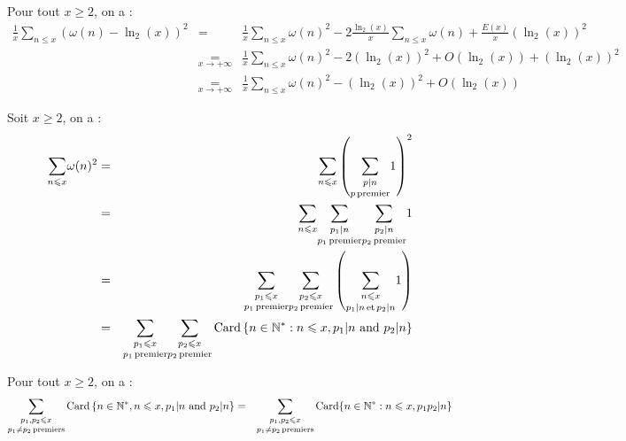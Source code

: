  Pour tout $x \geqslant 2$, on a :
\begin{eqnarray*}
  \frac{1}{x} \underset{n \leqslant x}{\sum} (\omega (n) - \ln_2 (x))^2 & = &
  \frac{1}{x} \underset{n \leqslant x}{\sum} \omega (n)^2 - 2 \frac{\ln_2
  (x)}{x} \underset{n \leqslant x}{\sum} \omega (n) + \frac{E (x)}{x} (\ln_2
  (x))^2\\
  & \underset{x \rightarrow + \infty}{=} & \frac{1}{x} \underset{n \leqslant
  x}{\sum} \omega (n)^2 - 2 (\ln_2 (x))^2 + O (\ln_2 (x)) + (\ln_2 (x))^2\\
  & \underset{x \rightarrow + \infty}{=} & \frac{1}{x} \underset{n \leqslant
  x}{\sum} \omega (n)^2 - (\ln_2 (x))^2 + O (\ln_2 (x))
\end{eqnarray*}


 Soit $x \geqslant 2$, on a :
\begin{eqnarray*}
  \underset{n \leqslant x}{\sum} \omega (n)^2 & = & \underset{n \leqslant
  x}{\sum} \left( \underset{p \operatorname{premier}}{\underset{p | n
  }{\sum}} 1 \underset{}{} \right)^2\\
  & = & \underset{n \leqslant x}{\sum} \underset{p_1
  \operatorname{premier}}{\underset{p_1 | n }{\sum}}  \underset{p_2
  \operatorname{premier}}{\underset{p_2 | n }{\sum}} 1 \underset{}{}\\
  & = & \underset{p_1 \operatorname{premier}}{\underset{p_1 \leqslant x}{\sum}}
  \underset{p_2 \operatorname{premier}}{\underset{p_2 \leqslant x}{\sum}} \left(
  \underset{p_1 | n  \operatorname{et} p_2 | n }{\underset{n
  \leqslant x}{\sum}} 1 \right)\\
  & = & \underset{p_1 \operatorname{premier}}{\underset{p_1 \leqslant x}{\sum}}
  \underset{p_2 \operatorname{premier}}{\underset{p_2 \leqslant x}{\sum}} \operatorname{Card}
  \left\{ n \in \mathbb{N}^{\ast} : n \leqslant x, p_1  | n 
  \text{ and } p_2 | n  \right\}
\end{eqnarray*}


 Pour tout $x \geqslant 2$, on a :
\begin{eqnarray*}
  \underset{p_1 \not{=} p_2 \operatorname{premiers}}{\underset{p_1, p_2 \leqslant
  x}{\sum}} \operatorname{Card} \left\{ n \in \mathbb{N}^{\ast}, n \leqslant x, p_1  |
  n  \text{ and } p_2 | n  \right\} & = & \underset{p_1
  \not{=} p_2 \operatorname{premiers}}{\underset{p_1, p_2 \leqslant x}{\sum}}
  \operatorname{Card} \{ n \in \mathbb{N}^{\ast} : n \leqslant x, p_1 p_2 | n
   \}
\end{eqnarray*}


